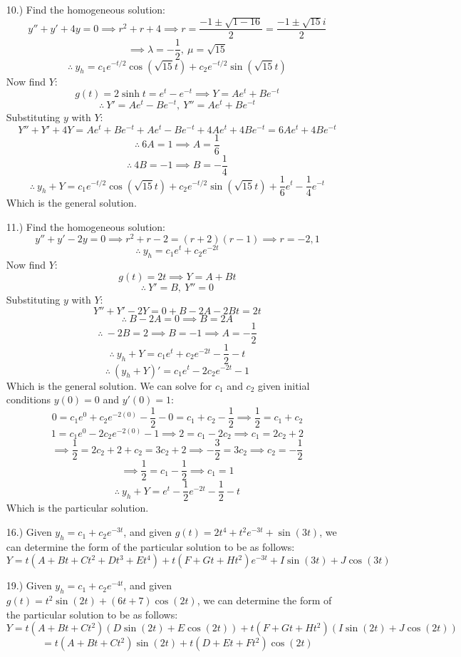 \documentclass[12pt]{article}
\newcommand{\parns}[1]{\left(#1\right)}
\begin{document}
\begin{itemize}
    \item [10.)] Find the homogeneous solution:
    \[y''+y'+4y=0\implies r^2+r+4\implies r=\frac{-1\pm\sqrt{1-16}}{2}=\frac{-1\pm\sqrt{15}i}{2}\]
    \[\implies \lambda=-\frac{1}{2},\ \mu=\sqrt{15}\]
    \[\therefore\ y_h=c_1e^{-t/2}\cos\parns{\sqrt{15}t}+c_2e^{-t/2}\sin\parns{\sqrt{15}t}\]
    Now find $Y$:
    \[g(t)=2\sinh t=e^t-e^{-t}\implies Y=Ae^t+Be^{-t}\]
    \[\therefore\ Y'=Ae^t-Be^{-t},\ Y''=Ae^t+Be^{-t}\]
    Substituting $y$ with $Y$:
    \[Y''+Y'+4Y=Ae^t+Be^{-t}+Ae^t-Be^{-t}+4Ae^t+4Be^{-t}=6Ae^t+4Be^{-t}\]
    \[\therefore\ 6A=1\implies A=\frac{1}{6}\]
    \[\therefore\ 4B=-1\implies B=-\frac{1}{4}\]
    \[\therefore\ y_h+Y=c_1e^{-t/2}\cos\parns{\sqrt{15}t}+c_2e^{-t/2}\sin\parns{\sqrt{15}t}+\frac{1}{6}e^t-\frac{1}{4}e^{-t}\]
    Which is the general solution.

    \item [11.)] Find the homogeneous solution:
    \[y''+y'-2y=0\implies r^2+r-2=(r+2)(r-1)\implies r=-2,1\]
    \[\therefore\ y_h=c_1e^t+c_2e^{-2t}\]
    Now find $Y$:
    \[g(t)=2t\implies Y=A+Bt\]
    \[\therefore\ Y'=B,\ Y''=0\]
    Substituting $y$ with $Y$:
    \[Y''+Y'-2Y=0+B-2A-2Bt=2t\]
    \[\therefore\ B-2A=0\implies B=2A\]
    \[\therefore\ -2B=2\implies B=-1\implies A=-\frac{1}{2}\]
    \[\therefore\ y_h+Y=c_1e^t+c_2e^{-2t}-\frac{1}{2}-t\]
    \[\therefore\ (y_h+Y)'=c_1e^t-2c_2e^{-2t}-1\]
    Which is the general solution. We can solve for $c_1$ and $c_2$ given initial conditions $y(0)=0$ and $y'(0)=1$:
    \[0=c_1e^{0}+c_2e^{-2(0)}-\frac{1}{2}-0=c_1+c_2-\frac{1}{2}\implies\frac{1}{2}=c_1+c_2\]
    \[1=c_1e^0-2c_2e^{-2(0)}-1\implies2=c_1-2c_2\implies c_1=2c_2+2\]
    \[\implies\frac{1}{2}=2c_2+2+c_2=3c_2+2\implies-\frac{3}{2}=3c_2\implies c_2=-\frac{1}{2}\]
    \[\implies\frac{1}{2}=c_1-\frac{1}{2}\implies c_1=1\]
    \[\therefore\ y_h+Y=e^t-\frac{1}{2}e^{-2t}-\frac{1}{2}-t\]
    Which is the particular solution.

    \item [16.)] Given $y_h=c_1+c_2e^{-3t}$, and given $g(t)=2t^4+t^2e^{-3t}+\sin(3t)$, we can determine the form of the particular solution to be as follows:
    \[Y=t(A+Bt+Ct^2+Dt^3+Et^4)+t(F+Gt+Ht^2)e^{-3t}+I\sin(3t)+J\cos(3t)\]

    \item [19.)] Given $y_h=c_1+c_2e^{-4t}$, and given $g(t)=t^2\sin(2t)+(6t+7)\cos(2t)$, we can determine the form of the particular solution to be as follows:
    \[Y=t(A+Bt+Ct^2)(D\sin(2t)+E\cos(2t))+t(F+Gt+Ht^2)(I\sin(2t)+J\cos(2t))\]
    \[=t(A+Bt+Ct^2)\sin(2t)+t(D+Et+Ft^2)\cos(2t)\]
\end{itemize}
\end{document}
